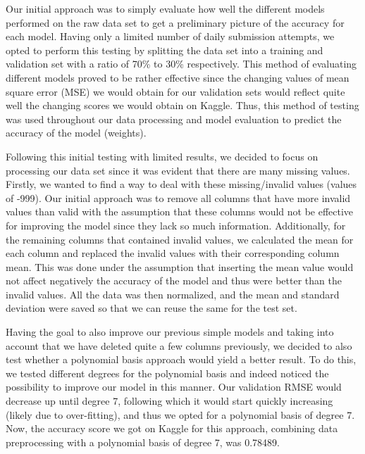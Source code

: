 \documentclass[10pt,conference,compsocconf]{IEEEtran}
\begin{document}
Our initial approach was to simply evaluate how well the different models performed on the raw data set to get a preliminary picture of the accuracy for each model. Having only a limited number of daily submission attempts, we opted to perform this testing by splitting the data set into a training and validation set with a ratio of 70\% to 30\% respectively. This method of evaluating different models proved to be rather effective since the changing values of mean square error (MSE) we would obtain for our validation sets would reflect quite well the changing scores we would obtain on Kaggle. Thus, this method of testing was used throughout our data processing and model evaluation to predict the accuracy of the model (weights).

Following this initial testing with limited results, we decided to focus on processing our data set since it was evident that there are many missing values. Firstly, we wanted to find a way to deal with these missing/invalid values (values of -999). Our initial approach was to remove all columns that have more invalid values than valid with the assumption that these columns would not be effective for improving the model since they lack so much information. Additionally, for the remaining columns that contained invalid values, we calculated the mean for each column and replaced the invalid values with their corresponding column mean. This was done under the assumption that inserting the mean value would not affect negatively the accuracy of the model and thus were better than the invalid values. All the data was then normalized, and the mean and standard deviation were saved so that we can reuse the same for the test set.

Having the goal to also improve our previous simple models and taking into account that we have deleted quite a few columns previously, we decided to also test whether a polynomial basis approach would yield a better result. To do this, we tested different degrees for the polynomial basis and indeed noticed the possibility to improve our model in this manner. Our validation RMSE would decrease up until degree 7, following which it would start quickly increasing (likely due to over-fitting), and thus we opted for a polynomial basis of degree 7. Now, the accuracy score we got on Kaggle for this approach, combining data preprocessing with a polynomial basis of degree 7, was 0.78489.
\end{document}
